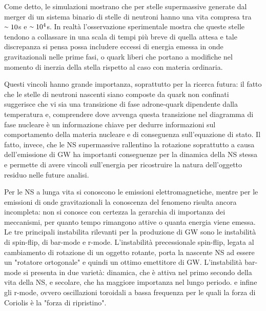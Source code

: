 Come detto, le simulazioni mostrano che per stelle supermassive generate dal merger di un sistema binario di stelle di neutroni hanno una vita compresa tra $\smallsim10$s e $\smallsim10^4$s. In realtà l'osservazione sperimentale mostra che queste stelle tendono a collassare in una scala di tempi più breve di quella attesa e tale discrepanza si pensa possa includere eccessi di energia emessa in onde gravitazionali nelle prime fasi, o quark liberi che portano a modifiche nel momento di inerzia della stella rispetto al caso con materia ordinaria.

Questi vincoli hanno grande importanza, soprattutto per la ricerca futura: il fatto che le stelle di neutroni nascenti siano composte da quark non confinati suggerisce che vi sia una transizione di fase adrone-quark dipendente dalla temperatura e, comprendere dove avvenga questa transizione nel diagramma di fase nucleare è un informazione chiave per dedurre informazioni sul comportamento della materia nucleare e di conseguenza sull'equazione di stato.
Il fatto, invece, che le NS supermassive rallentino la rotazione soprattutto a causa dell'emissione di GW ha importanti conseguenze per la dinamica della NS stessa e permette di avere vincoli sull'energia per ricostruire la natura dell'oggetto residuo nelle future analisi.

Per le NS a lunga vita si conoscono le emissioni elettromagnetiche, mentre per le emissioni di onde gravitazionali la conoscenza del fenomeno risulta ancora incompleta: non si conosce con certezza la gerarchia di importanza dei meccanismi, per quanto tempo rimangono attive o quanta energia viene emessa. Le tre principali instabilita rilevanti per la produzione di GW sono le instabilità di spin-flip, di bar-mode e r-mode.
L'instabilità precessionale spin-flip, legata al cambiamento di rotazione di un oggetto rotante, porta la nascente NS ad essere un "rotatore ortogonale" e quindi un ottimo emettitore di GW.
L'instabilità bar-mode si presenta in due varietà: dinamica, che è attiva nel primo secondo della vita della NS, e secolare, che ha maggiore importanza nel lungo periodo. 
e infine gli r-mode, ovvero oscillazioni toroidali a bassa frequenza per le quali la forza di Coriolis è la "forza di ripristino"\cite{sarin2020evolution}.